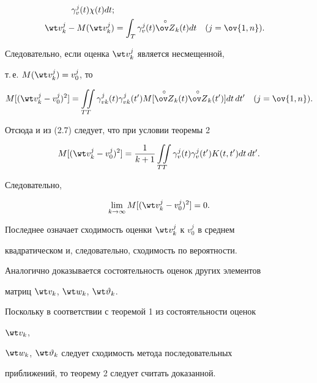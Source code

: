 \begin{pf}
\begin{align*}
\gamma^j_v(t)\chi(t)dt;\\


\wt v^j_k-M(\wt v^j_k)&=\int_T 


\gamma^j_v(t)\overset{\circ}{\ov Z}{}_k(t)dt 


\quad (j=\ov{1,n}). 


\end{align*} 


 


Следовательно, если оценка $\wt v^j_k$ является несмещенной, 


т.\,е. $M(\wt v^j_k)=v^j_0$, то 


$$ 


M[(\wt v^j_k-v^j_0)^2]=\iint\limits_{TT} 


\gamma^j_{vk}(t)\gamma^j_{vk}(t')M[ 


\overset{\circ}{\ov Z}{}_k(t) 


\overset{\circ}{\ov Z}{}_k(t')]dt\,dt'\quad 


(j=\ov{1,n}). 


$$ 


Отсюда и из (2.7) следует, что при условии теоремы 2


$$ 


M[(\wt v^j_k-v^j_0)^2]=\frac{1}{k+1}\iint\limits_{TT} 


\gamma^j_v(t)\gamma^j_v(t')K(t,t')dt\,dt'. 


$$ 


Следовательно,


$$ 


\lim_{k\to\infty}M[(\wt v^j_k-v^j_0)^2]=0. 


$$ 


Последнее означает сходимость оценки $\wt v^j_k$ к $v^j_0$ в среднем 


квадратическом и, следовательно, сходимость по вероятности. 


 


Аналогично доказывается состоятельность оценок других элементов 


матриц $\wt v_k$, $\wt w_k$, $\wt\vartheta_k$. 


 


Поскольку в соответствии с теоремой 1 из состоятельности оценок 


$\wt v_k$, 


$\wt w_k$, $\wt\vartheta_k$ следует сходимость метода последовательных 


приближений, то теорему 2 следует считать доказанной. 


\end{pf} 


